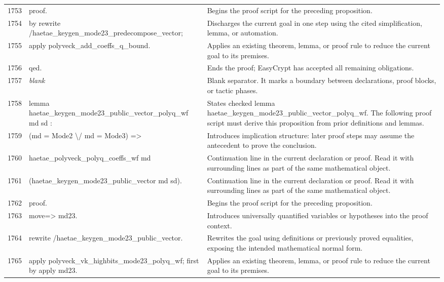 \documentclass[10pt]{article}
\begin{document}
\begin{longtable}{r L{0.53\textwidth} L{0.37\textwidth}}
1753 & {\ttfamily\scriptsize proof.} & Begins the proof script for the preceding proposition. \\
1754 & {\ttfamily\scriptsize by rewrite /haetae\_keygen\_mode23\_predecompose\_vector;} & Discharges the current goal in one step using the cited simplification, lemma, or automation. \\
1755 & {\ttfamily\scriptsize    apply polyveck\_add\_coeffs\_q\_bound.} & Applies an existing theorem, lemma, or proof rule to reduce the current goal to its premises. \\
1756 & {\ttfamily\scriptsize qed.} & Ends the proof; EasyCrypt has accepted all remaining obligations. \\
1757 & {\ttfamily\scriptsize \emph{blank}} & Blank separator.  It marks a boundary between declarations, proof blocks, or tactic phases. \\
1758 & {\ttfamily\scriptsize lemma haetae\_keygen\_mode23\_public\_vector\_polyq\_wf md sd :} & States checked lemma haetae\_keygen\_mode23\_public\_vector\_polyq\_wf.  The following proof script must derive this proposition from prior definitions and lemmas. \\
1759 & {\ttfamily\scriptsize   (md = Mode2 \textbackslash{}/ md = Mode3) =>} & Introduces implication structure: later proof steps may assume the antecedent to prove the conclusion. \\
1760 & {\ttfamily\scriptsize   haetae\_polyveck\_polyq\_coeffs\_wf md} & Continuation line in the current declaration or proof.  Read it with surrounding lines as part of the same mathematical object. \\
1761 & {\ttfamily\scriptsize     (haetae\_keygen\_mode23\_public\_vector md sd).} & Continuation line in the current declaration or proof.  Read it with surrounding lines as part of the same mathematical object. \\
1762 & {\ttfamily\scriptsize proof.} & Begins the proof script for the preceding proposition. \\
1763 & {\ttfamily\scriptsize move=> md23.} & Introduces universally quantified variables or hypotheses into the proof context. \\
1764 & {\ttfamily\scriptsize rewrite /haetae\_keygen\_mode23\_public\_vector.} & Rewrites the goal using definitions or previously proved equalities, exposing the intended mathematical normal form. \\
1765 & {\ttfamily\scriptsize apply polyveck\_vk\_highbits\_mode23\_polyq\_wf; first by apply md23.} & Applies an existing theorem, lemma, or proof rule to reduce the current goal to its premises. \\

\end{longtable}
\end{document}
